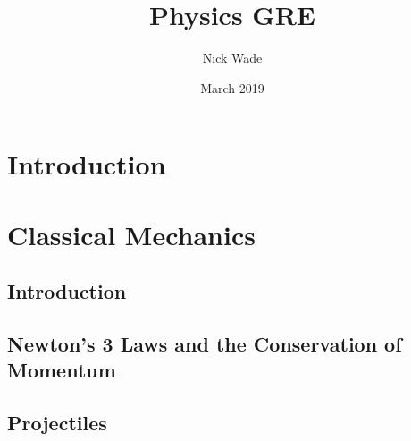 \documentclass{article}
\title{Physics GRE}
\author{Nick Wade}
\date{March 2019}
\begin{document}

\newpage



\tableofcontents
\newpage



\section{Introduction}

\newpage



\section{Classical Mechanics}


\subsection{Introduction}



\subsection{Newton's 3 Laws and the Conservation of Momentum}



\subsection{Projectiles}

\end{document}
